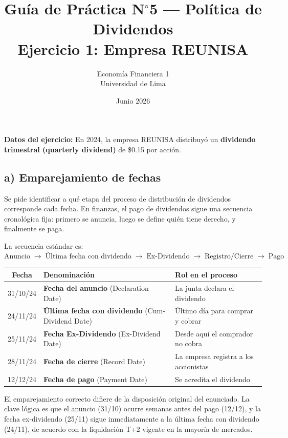\documentclass[12pt,a4paper]{article}
\title{\textbf{Guía de Práctica N$^\circ$5 — Política de Dividendos}\\[6pt]
       \large Ejercicio 1: Empresa REUNISA}
\author{Economía Financiera 1 \\ Universidad de Lima}
\date{Junio 2026}
\begin{document}
\maketitle

\textbf{Datos del ejercicio:} En 2024, la empresa REUNISA distribuyó un
\textbf{dividendo trimestral (quarterly dividend)} de \$0.15 por acción.

\subsection*{a) Emparejamiento de fechas}

\begin{intuicion}
Se pide identificar a qué etapa del proceso de distribución de dividendos
corresponde cada fecha. En finanzas, el pago de dividendos sigue una
secuencia cronológica fija: primero se anuncia, luego se define quién
tiene derecho, y finalmente se paga.
\end{intuicion}

La secuencia estándar es:
\[
\text{Anuncio} \;\longrightarrow\;
\text{Última fecha con dividendo} \;\longrightarrow\;
\text{Ex-Dividendo} \;\longrightarrow\;
\text{Registro/Cierre} \;\longrightarrow\;
\text{Pago}
\]

\begin{center}
\begin{tabular}{cll}
\toprule
\textbf{Fecha} & \textbf{Denominación} & \textbf{Rol en el proceso} \\
\midrule
31/10/24 & \textbf{Fecha del anuncio} (Declaration Date)
         & La junta declara el dividendo \\
24/11/24 & \textbf{Última fecha con dividendo} (Cum-Dividend Date)
         & Último día para comprar y cobrar \\
25/11/24 & \textbf{Fecha Ex-Dividendo} (Ex-Dividend Date)
         & Desde aquí el comprador no cobra \\
28/11/24 & \textbf{Fecha de cierre} (Record Date)
         & La empresa registra a los accionistas \\
12/12/24 & \textbf{Fecha de pago} (Payment Date)
         & Se acredita el dividendo \\
\bottomrule
\end{tabular}
\end{center}

\begin{interpretacion}
El emparejamiento correcto difiere de la disposición original del enunciado.
La clave lógica es que el anuncio (31/10) ocurre semanas antes del pago
(12/12), y la fecha ex-dividendo (25/11) sigue inmediatamente a la última
fecha con dividendo (24/11), de acuerdo con la liquidación T+2 vigente en la
mayoría de mercados.
\end{interpretacion}
\end{document}
